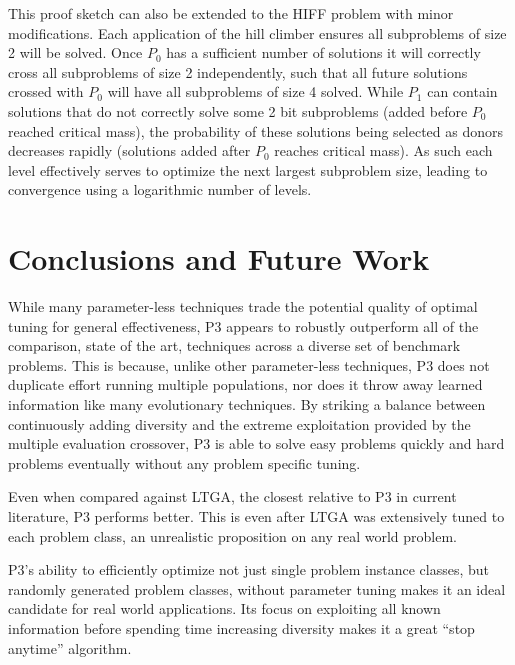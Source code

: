 \documentclass{sig-alternate}
\begin{document}
This proof sketch can also be extended to the HIFF problem with minor modifications.
Each application of the hill climber ensures all subproblems of size 2 will be solved.
Once $P_0$ has a sufficient number of solutions it will correctly cross all subproblems of size 2
independently, such that all future solutions crossed with $P_0$ will have all subproblems
of size 4 solved.  While $P_1$ can contain solutions that do not correctly solve some 2 bit
subproblems (added before $P_0$ reached critical mass), the probability of these solutions
being selected as donors decreases rapidly (solutions added after $P_0$ reaches critical mass).
As such each level effectively serves to optimize the next largest subproblem size, leading to
convergence using a logarithmic number of levels.


\section{Conclusions and Future Work}
While many parameter-less techniques trade the potential quality of optimal tuning
for general effectiveness, P3 appears to robustly outperform all of the comparison,
state of the art, techniques across a diverse set of benchmark problems.  This is
because, unlike other parameter-less techniques, P3 does not duplicate effort running
multiple populations, nor does it throw away learned information like many evolutionary
techniques.  By striking
a balance between continuously adding diversity and the extreme exploitation provided
by the multiple evaluation crossover, P3 is able to solve easy problems quickly
and hard problems eventually without any problem specific tuning.

Even when compared against LTGA, the closest relative to P3 in current literature,
P3 performs better.
This is even after LTGA was extensively tuned to each problem class, an unrealistic
proposition on any real world problem.

P3's ability to efficiently optimize not just single problem instance classes,
but randomly generated problem classes, without parameter tuning makes it an
ideal candidate for real world applications.  Its focus on exploiting all known
information before spending time increasing diversity makes it a great ``stop anytime''
algorithm.
\end{document}

